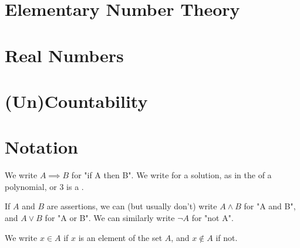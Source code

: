 \documentclass[12pt]{article}
\begin{document}
\section{Elementary Number Theory}
\section{Real Numbers}
\section{(Un)Countability}

\appendix

\newpage
\section{Notation}

We write $A \implies B$ for "if A then B".
We write \sol{} for a solution, as in the \sol{} of a polynomial, or $3$ is a \sol{}.

If $A$ and $B$ are assertions,
we can (but usually don't) write $A \land B$ for "A and B",
and $A \lor B$ for "A or B".
We can similarly write $\neg A$ for "not A".

We write $x \in A$ if $x$ is an element of the set $A$, and $x \notin A$ if not.
\end{document}
